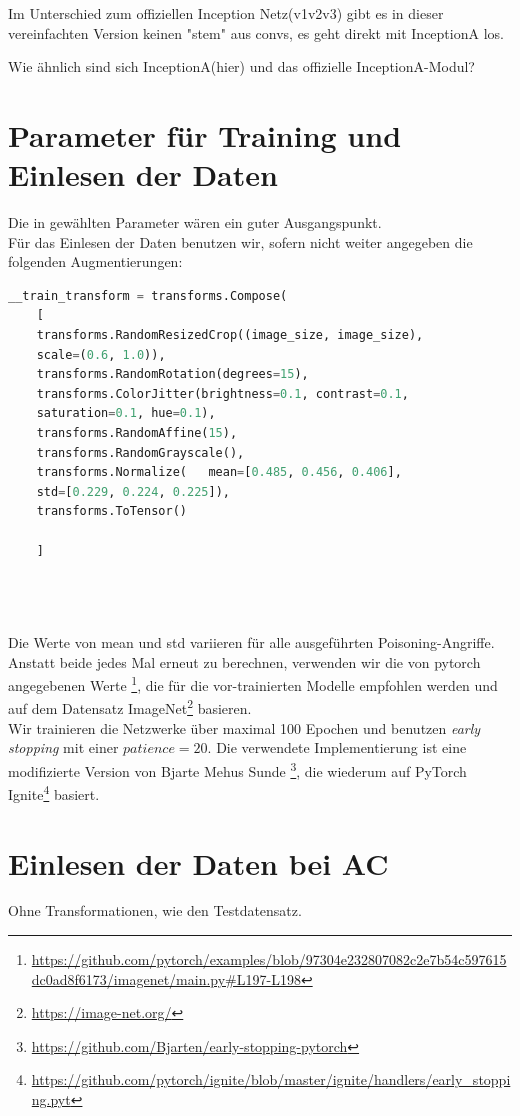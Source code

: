 \documentclass[11pt,a4paper]{article}
\numberwithin{equation}{section}
\begin{document}
	Im Unterschied zum offiziellen Inception Netz(v1v2v3) gibt es in dieser 
	vereinfachten Version keinen "stem" aus convs, 
	es geht direkt mit InceptionA los.
	
	Wie ähnlich sind sich InceptionA(hier) und das offizielle InceptionA-Modul?
	
	\section{Parameter für Training und Einlesen der Daten}\label{param_net}
	Die in \cite{CH} gewählten Parameter wären ein guter Ausgangspunkt.\\
	Für das Einlesen der Daten benutzen wir, sofern nicht weiter angegeben die folgenden Augmentierungen:
	
	\begin{lstlisting}[language=Python, caption=Augemntierung beim Einlesen der Daten]
	__train_transform = transforms.Compose(
	[
	transforms.RandomResizedCrop((image_size, image_size), 
	scale=(0.6, 1.0)),
	transforms.RandomRotation(degrees=15),
	transforms.ColorJitter(brightness=0.1, contrast=0.1, 
	saturation=0.1, hue=0.1),
	transforms.RandomAffine(15),
	transforms.RandomGrayscale(),
	transforms.Normalize(	mean=[0.485, 0.456, 0.406], 
	std=[0.229, 0.224, 0.225]),
	transforms.ToTensor()
	
	]
	
	
	
	\end{lstlisting}
	Die Werte von mean und std variieren für alle ausgeführten Poisoning-Angriffe. Anstatt beide jedes Mal erneut zu berechnen, verwenden wir die von pytorch angegebenen Werte \footnote{\url{https://github.com/pytorch/examples/blob/97304e232807082c2e7b54c597615dc0ad8f6173/imagenet/main.py\#L197-L198}}, die für die vor-trainierten Modelle empfohlen werden und auf dem Datensatz ImageNet\footnote{\url{https://image-net.org/}} basieren.\\ 
	Wir trainieren die Netzwerke über maximal 100 Epochen und benutzen \textit{early stopping} mit einer $patience=20$. Die verwendete Implementierung ist eine modifizierte Version von Bjarte Mehus Sunde \footnote{\url{https://github.com/Bjarten/early-stopping-pytorch}}, die wiederum auf PyTorch Ignite\footnote{\url{https://github.com/pytorch/ignite/blob/master/ignite/handlers/early\_stopping.pyt}} basiert.\\
	
	\section{Einlesen der Daten bei AC}
	Ohne Transformationen, wie den Testdatensatz.
	
\end{document}
